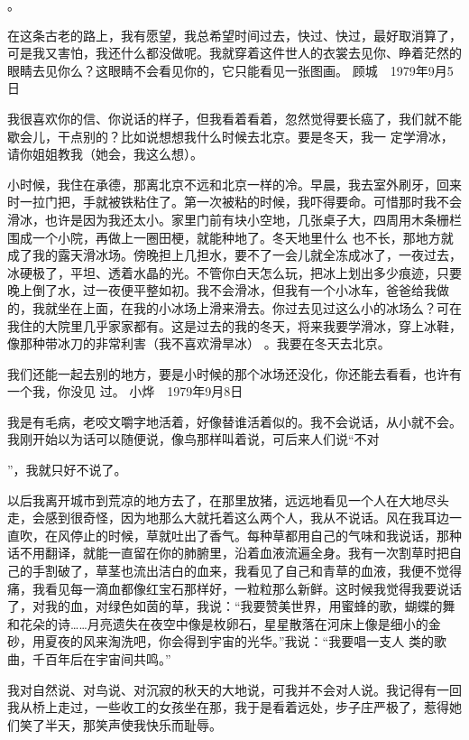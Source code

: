 \documentclass{article}
\begin{document}
。 

在这条古老的路上，我有愿望，我总希望时间过去，快过、快过，最好取消算了，可是我又害怕，我还什么都没做呢。我就穿着这件世人的衣裳去见你、睁着茫然的眼睛去见你么？这眼睛不会看见你的，它只能看见一张图画。 顾城　1979年9月5日



我很喜欢你的信、你说话的样子，但我看着看着，忽然觉得要长癌了，我们就不能歇会儿，干点别的？比如说想想我什么时候去北京。要是冬天，我一
定学滑冰，请你姐姐教我（她会，我这么想）。 

小时候，我住在承德，那离北京不远和北京一样的冷。早晨，我去室外刷牙，回来时一拉门把，手就被铁粘住了。第一次被粘的时候，我吓得要命。可惜那时我不会滑冰，也许是因为我还太小。家里门前有块小空地，几张桌子大，四周用木条栅栏围成一个小院，再做上一圈田梗，就能种地了。冬天地里什么
\newpage
也不长，那地方就成了我的露天滑冰场。傍晚担上几担水，要不了一会儿就全冻成冰了，一夜过去，冰硬极了，平坦、透着水晶的光。不管你白天怎么玩，把冰上划出多少痕迹，只要晚上倒了水，过一夜便平整如初。我不会滑冰，但我有一个小冰车，爸爸给我做的，我就坐在上面，在我的小冰场上滑来滑去。你过去见过这么小的冰场么？可在我住的大院里几乎家家都有。这是过去的我的冬天，将来我要学滑冰，穿上冰鞋，像那种带冰刀的非常利害（我不喜欢滑旱冰）
。我要在冬天去北京。 

我们还能一起去别的地方，要是小时候的那个冰场还没化，你还能去看看，也许有一个我，你没见
过。 小烨　1979年9月8日 



我是有毛病，老咬文嚼字地活着，好像替谁活着似的。我不会说话，从小就不会。我刚开始以为话可以随便说，像鸟那样叫着说，可后来人们说“不对

\newpage
”，我就只好不说了。 

以后我离开城市到荒凉的地方去了，在那里放猪，远远地看见一个人在大地尽头走，会感到很奇怪，因为地那么大就托着这么两个人，我从不说话。风在我耳边一直吹，在风停止的时候，草就吐出了香气。每种草都用自己的气味和我说话，那种话不用翻译，就能一直留在你的肺腑里，沿着血液流遍全身。我有一次割草时把自己的手割破了，草茎也流出洁白的血来，我看见了自己和青草的血液，我便不觉得痛，我看见每一滴血都像红宝石那样好，一粒粒那么新鲜。这时候我觉得我要说话了，对我的血，对绿色如茵的草，我说：“我要赞美世界，用蜜蜂的歌，蝴蝶的舞和花朵的诗……月亮遗失在夜空中像是枚卵石，星星散落在河床上像是细小的金砂，用夏夜的风来淘洗吧，你会得到宇宙的光华。”我说：“我要唱一支人
类的歌曲，千百年后在宇宙间共鸣。” 

我对自然说、对鸟说、对沉寂的秋天的大地说，可我并不会对人说。我记得有一回我从桥上走过，一些收工的女孩坐在那，我于是看着远处，步子庄严极了，惹得她们笑了半天，那笑声使我快乐而耻辱。
\newpage
\end{document}
